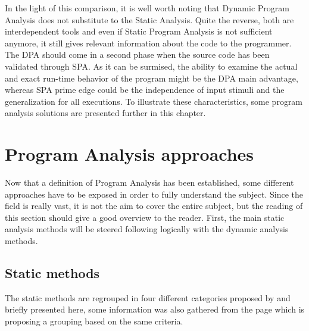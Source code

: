 \bigskip

In the light of this comparison, it is well worth noting that Dynamic Program Analysis does not substitute to the Static Analysis. Quite the reverse, both are interdependent tools and even if Static Program Analysis is not sufficient anymore, it still gives relevant information about the code to the programmer. The DPA should come in a second phase when the source code has been validated through SPA. As it can be surmised, the ability to examine the actual and exact run-time behavior of the program might be the DPA main advantage, whereas SPA prime edge could be the independence of input stimuli and the generalization for all executions. To illustrate these characteristics, some program analysis solutions are presented further in this chapter.

\pagebreak

\section{Program Analysis approaches}
Now that a definition of Program Analysis has been established, some different approaches have to be exposed in order to fully understand the subject. Since the field is really vast, it is not the aim to cover the entire subject, but the reading of this section should give a good overview to the reader. First, the main static analysis methods will be steered following logically with the dynamic analysis methods.

\subsection{Static methods}

The static methods are regrouped in four different categories proposed by \cite{Nielson2004} and briefly presented here, some information was also gathered from the \cite{Wikipedi2016} page which is proposing a grouping based on the same criteria.

